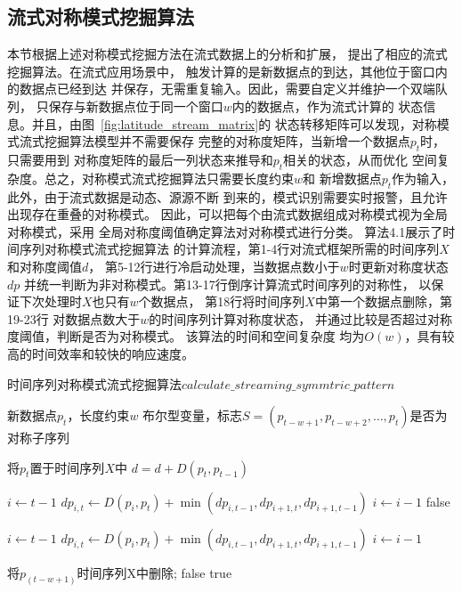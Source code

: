 \subsection{流式对称模式挖掘算法}
本节根据上述对称模式挖掘方法在流式数据上的分析和扩展，
提出了相应的流式挖掘算法。在流式应用场景中，
触发计算的是新数据点的到达，其他位于窗口内的数据点已经到达
并保存，无需重复输入。因此，需要自定义并维护一个双端队列，
只保存与新数据点位于同一个窗口$w$内的数据点，作为流式计算的
状态信息。并且，由图~\ref{fig:latitude_stream_matrix}的
状态转移矩阵可以发现，对称模式流式挖掘算法模型并不需要保存
完整的对称度矩阵，当新增一个数据点$p_t$时，只需要用到
对称度矩阵的最后一列状态来推导和$p_t$相关的状态，从而优化
空间复杂度。总之，对称模式流式挖掘算法只需要长度约束$w$和
新增数据点$p_t$作为输入，此外，由于流式数据是动态、源源不断
到来的，模式识别需要实时报警，且允许出现存在重叠的对称模式。
因此，可以把每个由流式数据组成对称模式视为全局对称模式，采用
全局对称度阈值确定算法对对称模式进行分类。
算法4.1展示了时间序列对称模式流式挖掘算法
的计算流程，第1-4行对流式框架所需的时间序列$X$和对称度阈值$d$，
第5-12行进行冷启动处理，当数据点数小于$w$时更新对称度状态$dp$
并统一判断为非对称模式。第13-17行倒序计算流式时间序列的对称性，
以保证下次处理时$X$也只有$w$个数据点，
第18行将时间序列$X$中第一个数据点删除，第19-23行
对数据点数大于$w$的时间序列计算对称度状态，
并通过比较是否超过对称度阈值，判断是否为对称模式。
该算法的时间和空间复杂度
均为$O\left(w\right)$，具有较高的时间效率和较快的响应速度。

\renewcommand{\algorithmicrequire}{\textbf{输入：}\unskip}
\renewcommand{\algorithmicensure}{\textbf{输出：}\unskip}

\begin{algorithm}
  \caption{时间序列对称模式流式挖掘算法$calculate\_streaming\_symmtric\_pattern$}
  \label{alg:streaming_symmetric_pattern}
  \small
  \begin{algorithmic}
    \REQUIRE 新数据点$p_t$，长度约束$w$
    \ENSURE 布尔型变量，标志$S=\left(p_{t-w+1},p_{t-w+2},…,p_t \right)$是否为对称子序列

    \STATE 将$p_t$置于时间序列$X$中
      \STATE $d=d+D\left(p_{t}, p_{t-1}\right)$
    \ENDIF

      \STATE $i \leftarrow t-1$
        \STATE $dp_{i,t} \leftarrow D\left(p_{i}, p_{t} \right) + \min \left(dp_{i,t-1},dp_{i+1,t},dp_{i+1,t-1}\right)$
        \STATE $i \leftarrow i-1$
      \ENDWHILE
      \RETURN false
    \ENDIF

    \STATE $i \leftarrow t-1$
      \STATE $dp_{i,t} \leftarrow D\left(p_{i}, p_{t} \right) + \min \left(dp_{i,t-1},dp_{i+1,t},dp_{i+1,t-1}\right)$
      \STATE $i \leftarrow i-1$
    \ENDWHILE

    \STATE 将$p_(t-w+1)$时间序列X中删除;
      \RETURN false
    \ELSE
      \RETURN true
    \ENDIF
  \end{algorithmic}
\end{algorithm}

